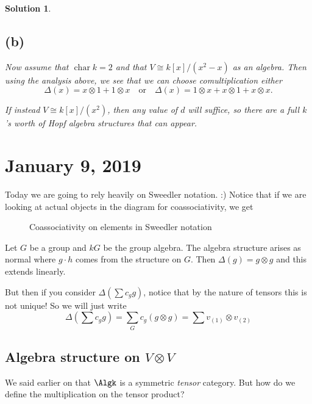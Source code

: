 \documentclass[12pt]{article}
\theoremstyle{break}
\theoremstyle{nonumberbreak}
\newtheorem{sol}{Solution}
\theoremstyle{changebreak}
\theoremstyle{break}
\theoremstyle{nonumberbreak}
\theoremstyle{nonumberplain}
\theoremstyle{change}
\DeclareMathOperator{\ch}{char}
\begin{document}
\begin{sol}
	\subsection*{(b)}
	Now assume that $\ch k=2$ and that $V\cong k[x]/(x^2-x)$ as an algebra. Then using the analysis above, 
	we see that we can choose comultiplication either
	\[\Delta(x)=x\otimes 1+1\otimes x\quad\text{or}\quad \Delta(x)=1\otimes x+x\otimes 1+x\otimes x.\]

	If instead $V\cong k[x]/(x^2)$, then \textit{any} value of $d$ will suffice, so there are a full $k$'s worth
	of Hopf algebra structures that can appear.
\end{sol} 

\section{January 9, 2019}
Today we are going to rely heavily on Sweedler notation. :) Notice that if we are looking at actual objects in the 
diagram for coassociativity, we get
\begin{figure}[h]
	\centering
	\caption{Coassociativity on elements in Sweedler notation}
\end{figure}

\begin{ex}
	Let $G$ be a group and $kG$ be the group algebra. The algebra structure arises as normal
	where $g\cdot h$ comes from the structure on $G$. Then $\Delta(g)=g\otimes g$ and this extends linearly.

	But then if you consider $\Delta(\sum c_gg)$, notice that by the nature of tensors this is not unique!
	So we will just write
	\[\Delta\left(\sum c_gg\right)=\sum_Gc_g(g\otimes g)=\sum v_{(1)}\otimes v_{(2)}\]
\end{ex}

\subsection{Algebra structure on $V\otimes V$}
We said earlier on that $\Algk$ is a symmetric \textit{tensor} category. But how do we
define the multiplication on the tensor product?
\end{document}
